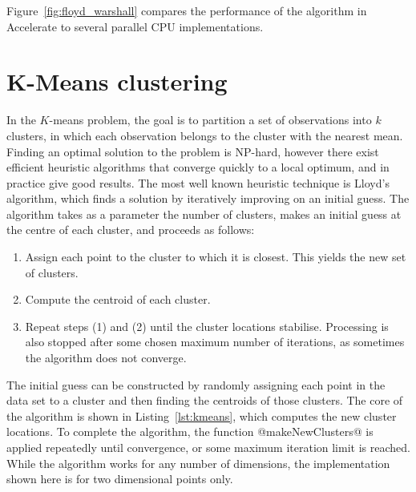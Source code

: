 Figure~\ref{fig:floyd_warshall} compares the performance of the algorithm in
Accelerate to several parallel CPU implementations.


\section{K-Means clustering}

In the $K$-means problem, the goal is to partition a set of observations into
$k$ clusters, in which each observation belongs to the cluster with the nearest
mean. Finding an optimal solution to the problem is NP-hard, however there exist
efficient heuristic algorithms that converge quickly to a local optimum, and in
practice give good results. The most well known heuristic technique is Lloyd's
algorithm, which finds a solution by iteratively improving on an initial guess.
The algorithm takes as a parameter the number of clusters, makes an initial
guess at the centre of each cluster, and proceeds as follows:
%
\begin{enumerate}
    \item Assign each point to the cluster to which it is closest. This yields
        the new set of clusters.

    \item Compute the centroid of each cluster.

    \item Repeat steps (1) and (2) until the cluster locations stabilise.
        Processing is also stopped after some chosen maximum number of
        iterations, as sometimes the algorithm does not converge.
\end{enumerate}
%
The initial guess can be constructed by randomly assigning each point in the
data set to a cluster and then finding the centroids of those clusters. The core
of the algorithm is shown in Listing~\ref{lst:kmeans}, which computes the new
cluster locations. To complete the algorithm, the function @makeNewClusters@ is
applied repeatedly until convergence, or some maximum iteration limit is
reached. While the algorithm works for any number of dimensions, the
implementation shown here is for two dimensional points only.

